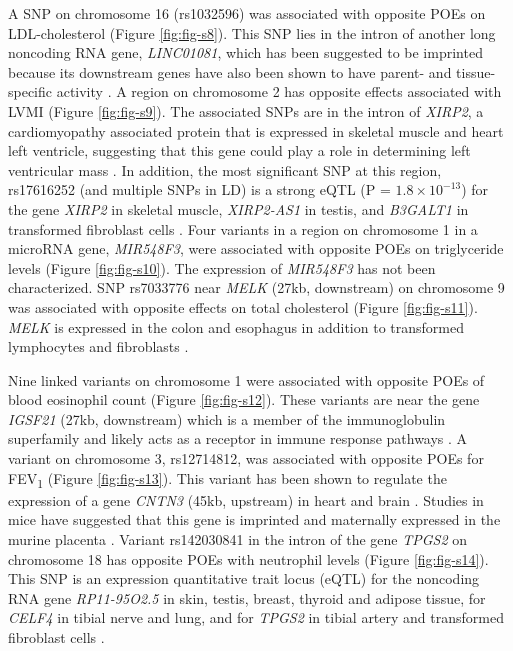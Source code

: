  A SNP on chromosome 16 (rs1032596) was associated with opposite POEs on LDL-cholesterol (Figure \ref{fig:fig-s8}). This SNP lies in the intron of another long noncoding RNA gene, \emph{LINC01081}, which has been suggested to be imprinted because its downstream genes have also been shown to have parent- and tissue-specific activity \cite{Szafranski:2016fz}. A region on chromosome 2 has opposite effects associated with LVMI (Figure \ref{fig:fig-s9}). The associated SNPs are in the intron of \emph{XIRP2}, a cardiomyopathy associated protein that is expressed in skeletal muscle and heart left ventricle, suggesting that this gene could play a role in determining left ventricular mass \cite{Wang:2014jg,Nilsson:2013jy,Consortium2015}. In addition, the most significant SNP at this region, rs17616252 (and multiple SNPs in LD) is a strong eQTL (P = $1.8 \times10^{-13} $) for the gene \emph{XIRP2} in skeletal muscle, \emph{XIRP2-AS1} in testis, and \emph{B3GALT1} in transformed fibroblast cells \cite{Consortium2015}. Four variants in a region on chromosome 1 in a microRNA gene, \emph{MIR548F3}, were associated with opposite POEs on triglyceride levels (Figure \ref{fig:fig-s10}). The expression of \emph{MIR548F3} has not been characterized. SNP rs7033776 near \emph{MELK} (27kb, downstream) on chromosome 9 was associated with opposite effects on total cholesterol (Figure \ref{fig:fig-s11}). \emph{MELK} is expressed in the colon and esophagus in addition to transformed lymphocytes and fibroblasts \cite{Consortium2015}. 


Nine linked variants on chromosome 1 were associated with opposite POEs of blood eosinophil count (Figure \ref{fig:fig-s12}). These variants are near the gene \emph{IGSF21} (27kb, downstream) which is a member of the immunoglobulin superfamily and likely acts as a receptor in immune response pathways \cite{OLeary:2016cm}. A variant on chromosome 3, rs12714812, was associated with opposite POEs for FEV\textsubscript{1} (Figure \ref{fig:fig-s13}). This variant has been shown to regulate the expression of a gene \emph{CNTN3} (45kb, upstream) in heart and brain \cite{Consortium2015}. Studies in mice have suggested that this gene is imprinted and maternally expressed in the murine placenta \cite{Brideau:2010gz}. Variant rs142030841 in the intron of the gene \emph{TPGS2} on chromosome 18 has opposite POEs with neutrophil levels (Figure \ref{fig:fig-s14}). This SNP is an expression quantitative trait locus (eQTL) for the noncoding RNA gene \emph{RP11-95O2.5} in skin, testis, breast, thyroid and adipose tissue, for \emph{CELF4} in tibial nerve and lung, and for \emph{TPGS2} in tibial artery and transformed fibroblast cells \cite{Consortium2015}.


